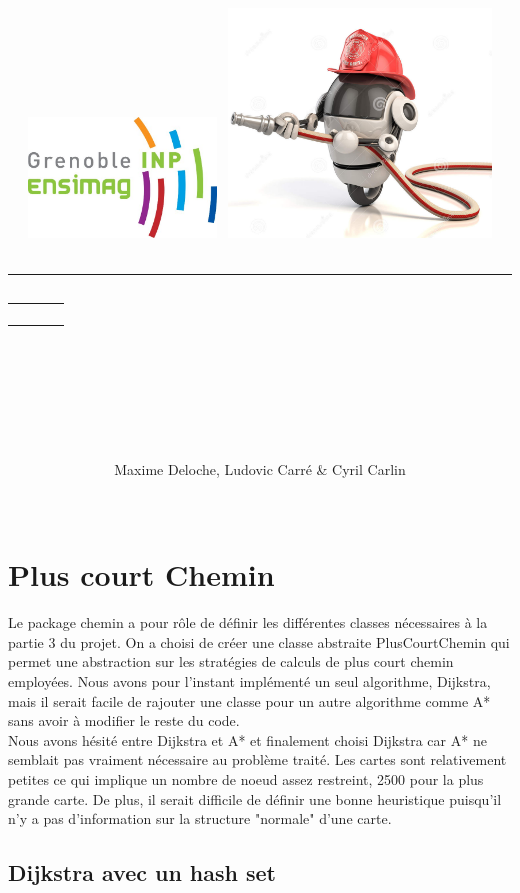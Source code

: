 \documentclass[12pt,a4paper]{article}
\title{
	\begin{flushleft}
		\includegraphics[width=5cm]{rapport/logo_ensimag.jpg} \hfill
		\includegraphics[width=7cm]{rapport/firebot.jpg} \\[40pt]
	\end{flushleft} 
	{\rule{15cm}{1mm}}\vspace{7mm}
	\begin{tabular}{p{4cm} r}
		& {\Huge {\bf \typedeprojet}} \\[20pt]
		& {\huge \nomduprojet}
	\end{tabular}\\
	\vspace{7mm}{\rule{15cm}{1mm}}\vspace{2mm} \\
	\hfill \large \dateduprojet \hspace{2cm}
	\renewcommand{\contentsname}{\LARGE \it Sommaire \hfill} %
	\setcounter{tocdepth}{2} %
	\tableofcontents
	\vfill
}
\author{
	\begin{tabular}{p{15cm}}
		\Large Maxime Deloche, Ludovic Carré \& Cyril Carlin
	\end{tabular} \\
	\hline
}
\date{}
\begin{document}
\maketitle
\thispagestyle{empty} %
\newpage


\section{Plus court Chemin}

Le package chemin a pour rôle de définir les différentes classes nécessaires à la partie 3 du projet. On a choisi de créer une classe abstraite PlusCourtChemin qui permet une abstraction sur les stratégies de calculs de plus court chemin employées. Nous avons pour l'instant implémenté un seul algorithme, Dijkstra, mais il serait facile de rajouter une classe pour un autre algorithme comme A* sans avoir à modifier le reste du code.\\

Nous avons hésité entre Dijkstra et A* et finalement choisi Dijkstra car A* ne semblait pas vraiment nécessaire au problème traité. Les cartes sont relativement petites ce qui implique un nombre de noeud assez restreint, 2500 pour la plus grande carte. De plus, il serait difficile de définir une bonne heuristique puisqu'il n'y a pas d'information sur la structure "normale" d'une carte.

\subsection{Dijkstra avec un hash set}
\end{document}
